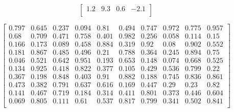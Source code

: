 \documentclass[10pt]{article}
\begin{document}
$$
\begin{bmatrix}
  1.2 & 9.3 & 0.6 & -2.1\\
\end{bmatrix}
$$

$$
\begin{bmatrix}
0.797 & 0.645 & 0.237 & 0.094 & 0.81 & 0.494 & 0.747 & 0.972 & 0.775 & 0.957\\
0.68 & 0.709 & 0.471 & 0.758 & 0.401 & 0.982 & 0.256 & 0.058 & 0.114 & 0.15\\
0.166 & 0.173 & 0.089 & 0.458 & 0.884 & 0.319 & 0.92 & 0.08 & 0.902 & 0.552\\
0.181 & 0.867 & 0.485 & 0.496 & 0.21 & 0.788 & 0.364 & 0.245 & 0.894 & 0.75\\
0.046 & 0.521 & 0.642 & 0.951 & 0.193 & 0.653 & 0.148 & 0.074 & 0.668 & 0.525\\
0.134 & 0.925 & 0.418 & 0.822 & 0.377 & 0.105 & 0.429 & 0.536 & 0.799 & 0.22\\
0.367 & 0.198 & 0.848 & 0.403 & 0.91 & 0.882 & 0.188 & 0.745 & 0.836 & 0.861\\
0.473 & 0.382 & 0.791 & 0.637 & 0.616 & 0.169 & 0.447 & 0.29 & 0.23 & 0.82\\
0.141 & 0.467 & 0.719 & 0.184 & 0.314 & 0.411 & 0.801 & 0.373 & 0.446 & 0.604\\
0.069 & 0.805 & 0.111 & 0.61 & 0.537 & 0.817 & 0.799 & 0.341 & 0.502 & 0.841\\
\end{bmatrix}
$$
\end{document}
